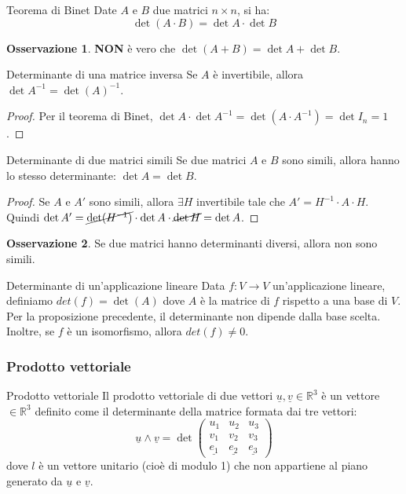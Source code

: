 \documentclass[a4paper]{article}
\theoremstyle{definition}
\newtheorem*{oss}{Osservazione}
\begin{document}
\begin{teo}{Teorema di Binet}{}
	Date $A$ e $B$ due matrici $n \times n$, si ha:
	\begin{equation*}
		\det(A \cdot B) = \det A \cdot \det B
	\end{equation*}
	\begin{oss}
		\textbf{NON} è vero che $\det(A + B) = \det A + \det B$.
	\end{oss}
\end{teo}
\begin{cor}{Determinante di una matrice inversa}{}
	Se $A$ è invertibile, allora $\det A^{-1} = \det(A)^{-1}$.
\end{cor}
\begin{proof}
	Per il teorema di Binet, $\det A \cdot \det A^{-1} = \det(A \cdot A^{-1}) = \det I_n = 1$.
\end{proof}
\begin{cor}{Determinante di due matrici simili}{}
	Se due matrici $A$ e $B$ sono simili, allora hanno lo stesso determinante: $\det A = \det B$.
\end{cor}
\begin{proof}
	Se $A$ e $A'$ sono simili, allora $\exists H$ invertibile tale che $A' = H^{-1} \cdot A \cdot H$.
	Quindi $\det A' = \cancel{\det(H^{-1})} \cdot \det A \cdot \cancel{\det H} = \det A$.
\end{proof}

\begin{oss}
	Se due matrici hanno determinanti diversi, allora non sono simili.
\end{oss}

\begin{deff}{Determinante di un'applicazione lineare}{}
	Data $f: V \rightarrow V$ un'applicazione lineare, definiamo $det(f) = \det(A)$ dove $A$ è la matrice di $f$ rispetto a una base di $V$.
	Per la proposizione precedente, il determinante non dipende dalla base scelta.
	Inoltre, se $f$ è un isomorfismo, allora $det(f) \ne 0$.
\end{deff}

\subsubsection*{Prodotto vettoriale}
\begin{deff}{Prodotto vettoriale}{}
	Il prodotto vettoriale di due vettori $\underline{u}, \underline{v} \in \mathbb{R}^3$ è un vettore $\in \mathbb{R}^3$ definito come il determinante della matrice formata dai tre vettori:
	\begin{equation*}
		\underline{u} \wedge \underline{v} = \det \begin{pmatrix}
			u_1 & u_2 & u_3 \\
			v_1 & v_2 & v_3 \\
			\underline{e_1} & \underline{e_2} & \underline{e_3}
		\end{pmatrix}
	\end{equation*}
	dove $l$ è un vettore unitario (cioè di modulo 1) che non appartiene al piano generato da $\underline{u}$ e $\underline{v}$.
\end{deff}
\end{document}
